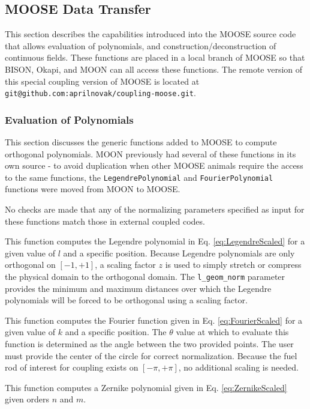 \documentclass[10pt]{article}
\newcounter{subsubsubsection}[subsubsection]
\numberwithin{equation}{section} %
\begin{document}
\subsection{MOOSE Data Transfer}
This section describes the capabilities introduced into the MOOSE source code that allows evaluation of polynomials, and construction/deconstruction of continuous fields. These functions are placed in a local branch of MOOSE so that BISON, Okapi, and MOON can all access these functions. The remote version of this special coupling version of MOOSE is located at {\tt git@github.com:aprilnovak/coupling-moose.git}.

\subsubsection{Evaluation of Polynomials}
This section discusses the generic functions added to MOOSE to compute orthogonal polynomials. MOON previously had several of these functions in its own source - to avoid duplication when other MOOSE animals require the access to the same functions, the {\tt LegendrePolynomial} and {\tt FourierPolynomial} functions were moved from MOON to MOOSE.

\color{magenta}
No checks are made that any of the normalizing parameters specified as input for these functions match those in external coupled codes.
\color{black}

This function computes the Legendre polynomial in Eq. \eqref{eq:LegendreScaled} for a given value of \(l\) and a specific position. Because Legendre polynomials are only orthogonal on \([-1, +1]\), a scaling factor \(z\) is used to simply stretch or compress the physical domain to the orthogonal domain. The {\tt l\_geom\_norm} parameter provides the minimum and maximum distances over which the Legendre polynomials will be forced to be orthogonal using a scaling factor. 

This function computes the Fourier function given in Eq. \eqref{eq:FourierScaled} for a given value of \(k\) and a specific position. The \(\theta\) value at which to evaluate this function is determined as the angle between the two provided points. The user must provide the center of the circle for correct normalization. Because the fuel rod of interest for coupling exists on \([-\pi, +\pi]\), no additional scaling is needed.

This function computes a Zernike polynomial given in Eq. \eqref{eq:ZernikeScaled} given orders \(n\) and \(m\). 
\end{document}
